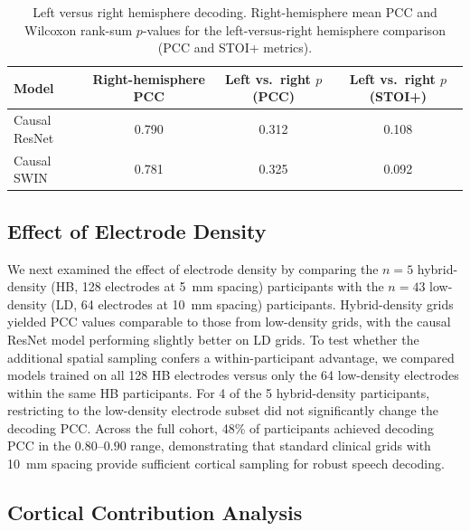 \documentclass[10pt]{article}
\begin{document}
\begin{table}[htbp]
\centering
\caption{Left versus right hemisphere decoding. Right-hemisphere mean PCC and Wilcoxon rank-sum $p$-values for the left-versus-right hemisphere comparison (PCC and STOI+ metrics).}
\label{tab:hemisphere}
\begin{tabular}{lccc}
\toprule
Model & Right-hemisphere PCC & Left vs.\ right $p$ (PCC) & Left vs.\ right $p$ (STOI+) \\
\midrule
Causal ResNet & 0.790 & 0.312 & 0.108 \\
Causal SWIN   & 0.781 & 0.325 & 0.092 \\
\bottomrule
\end{tabular}
\end{table}

\subsection{Effect of Electrode Density}

We next examined the effect of electrode density by comparing the $n=5$ hybrid-density (HB, 128 electrodes at 5~mm spacing) participants with the $n=43$ low-density (LD, 64 electrodes at 10~mm spacing) participants. Hybrid-density grids yielded PCC values comparable to those from low-density grids, with the causal ResNet model performing slightly better on LD grids. To test whether the additional spatial sampling confers a within-participant advantage, we compared models trained on all 128 HB electrodes versus only the 64 low-density electrodes within the same HB participants. For 4 of the 5 hybrid-density participants, restricting to the low-density electrode subset did not significantly change the decoding PCC. Across the full cohort, 48\% of participants achieved decoding PCC in the $0.80$--$0.90$ range, demonstrating that standard clinical grids with 10~mm spacing provide sufficient cortical sampling for robust speech decoding.

\subsection{Cortical Contribution Analysis}
\end{document}
